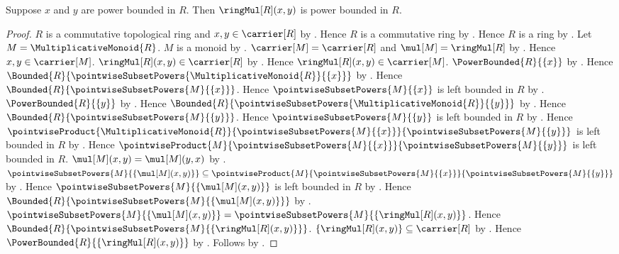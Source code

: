 \begin{theorem}\label{power_bounded_element_multiplication}
    Suppose $x$ and $y$ are power bounded in $R$.
    Then $\ringMul[R](x,y)$ is power bounded in $R$.
\end{theorem}
\begin{proof}
    $R$ is a commutative topological ring and $x,y\in\carrier[R]$ by
        .
    Hence $R$ is a commutative ring by
        .
    Hence $R$ is a ring by .
    Let $M=\MultiplicativeMonoid{R}$.
    $M$ is a monoid by .
    $\carrier[M]=\carrier[R]$ and $\mul[M]=\ringMul[R]$ by
        .
    Hence $x,y\in\carrier[M]$.
    $\ringMul[R](x,y)\in\carrier[R]$ by .
    Hence $\ringMul[R](x,y)\in\carrier[M]$.
    $\PowerBounded{R}{\{x\}}$ by .
    Hence $\Bounded{R}{\pointwiseSubsetPowers{
        \MultiplicativeMonoid{R}}{\{x\}}}$ by
        .
    Hence $\Bounded{R}{\pointwiseSubsetPowers{M}{\{x\}}}$.
    Hence $\pointwiseSubsetPowers{M}{\{x\}}$ is left bounded in $R$ by
        .
    $\PowerBounded{R}{\{y\}}$ by .
    Hence $\Bounded{R}{\pointwiseSubsetPowers{
        \MultiplicativeMonoid{R}}{\{y\}}}$ by
        .
    Hence $\Bounded{R}{\pointwiseSubsetPowers{M}{\{y\}}}$.
    Hence $\pointwiseSubsetPowers{M}{\{y\}}$ is left bounded in $R$ by
        .
    Hence $\pointwiseProduct{
        \MultiplicativeMonoid{R}}{
        \pointwiseSubsetPowers{M}{\{x\}}}{
        \pointwiseSubsetPowers{M}{\{y\}}}$ is left bounded in $R$ by
        .
    Hence $\pointwiseProduct{M}{
        \pointwiseSubsetPowers{M}{\{x\}}}{
        \pointwiseSubsetPowers{M}{\{y\}}}$ is left bounded in $R$.
    $\mul[M](x,y)=\mul[M](y,x)$ by
        .
    $\pointwiseSubsetPowers{M}{\{\mul[M](x,y)\}}
        \subseteq\pointwiseProduct{M}{
            \pointwiseSubsetPowers{M}{\{x\}}}{
            \pointwiseSubsetPowers{M}{\{y\}}}$ by
        .
    Hence $\pointwiseSubsetPowers{M}{\{\mul[M](x,y)\}}$
        is left bounded in $R$ by .
    Hence $\Bounded{R}{\pointwiseSubsetPowers{M}{
        \{\mul[M](x,y)\}}}$ by
        .
    $\pointwiseSubsetPowers{M}{\{\mul[M](x,y)\}}
        =\pointwiseSubsetPowers{M}{\{\ringMul[R](x,y)\}}$.
    Hence $\Bounded{R}{\pointwiseSubsetPowers{M}{
        \{\ringMul[R](x,y)\}}}$.
    $\{\ringMul[R](x,y)\}\subseteq\carrier[R]$ by
        .
    Hence $\PowerBounded{R}{\{\ringMul[R](x,y)\}}$ by
        .
    Follows by .
\end{proof}

